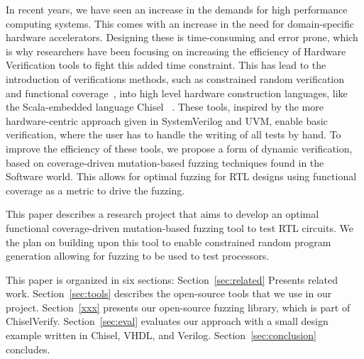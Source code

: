 \documentclass[conference]{IEEEtran}
\begin{document}
In recent years, we have seen an increase in the demands for high performance computing systems.  
This comes with an increase in the need for domain-specific hardware accelerators.  
Designing these is time-consuming and error prone, which is why researchers have been focusing on increasing the efficiency of Hardware Verification tools to fight this added time constraint.
This has lead to the introduction of verifications methods, such as constrained random verification and functional coverage~\cite{verify:chisel:2020, dobis2021opensource}, into high level hardware construction languages, like the Scala-embedded language Chisel~\cite{chisel:dac2012, chisel:book} .
These tools, inspired by the more hardware-centric approach given in SystemVerilog and UVM, enable basic verification, where the user has to handle the writing of all tests by hand.
To improve the efficiency of these tools, we propose a form of dynamic verification, based on coverage-driven mutation-based fuzzing techniques found in the Software world.
This allows for optimal fuzzing for RTL designs using functional coverage as a metric to drive the fuzzing.

This paper describes a research project that aims to develop an optimal functional coverage-driven mutation-based fuzzing tool to test RTL circuits.
We the plan on building upon this tool to enable constrained random program generation allowing for fuzzing to be used to test processors.

This paper is organized in six sections: %
Section~\ref{sec:related}  Presents related work.
Section~\ref{sec:tools} describes the open-source tools that we use in our project.
Section~\ref{xxx} presents our open-source fuzzing library, which is part of ChiselVerify.
Section~\ref{sec:eval} evaluates our approach with a small design example written in Chisel, VHDL,
and Verilog.
Section~\ref{sec:conclusion} concludes.
\end{document}
